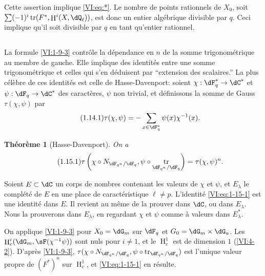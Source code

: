 \documentclass[oneside]{book}
\DeclareMathOperator{\h}{H}
\DeclareMathOperator{\tr}{tr}
\theoremstyle{sga-source}
\theoremstyle{sga-source-dash}
\theoremstyle{sga-source-dotdash}
\theoremstyle{sga-source-number-note-dash}
\theoremstyle{sga-source-note-number-dotdash}
\theoremstyle{sga-source-example-dotdash}
\theoremstyle{sga-source-inline-number}
\theoremstyle{sga-source-bare-number}
\theoremstyle{sga-source}
\newtheorem{theorem_}[subsection]{Théorème}
\newcommand{\PrintPage}[1]{}\newcommand{\MathPage}[1]{}\newcommand{\PrintCite}[2]{#1}\newcommand{\var}[3]{#1}
\begin{document}
Cette assertion implique \eqref{VI:eq:*}. Le nombre de points rationnels de 
$X_0$, soit $\var{\sum (-1)^i \tr(F^\ast,\h^i(X,\dQ_\ell))}{\sum (-1)^i \tr(F^\ast,\h_c^i(X,\dQ_\ell))}{S45-SOL-0697}$, est donc un entier 
algébrique divisible par $q$. Ceci implique qu'il soit divisible par $q$ en 
tant qu'entier rationnel. 





\PrintPage{177}
\subsection{}\label{VI:1-14}

La formule \ref{VI:1-9-3} contrôle la dépendance en $n$ de la somme 
trigonométrique au membre de gauche. Elle implique des identités entre une 
somme trigonométrique et celles qui s'en déduisent par ``extension des 
scalaires.'' La plus célèbre de ces identités est celle de 
Hasse-Davenport: soient $\chi:\dF_q^\ast \to \dC^\ast$ et 
$\psi:\dF_q\to \dC^\ast$ des caractères, $\psi$ non trivial, et 
définissons la somme de Gauss $\tau(\chi,\psi)$ par 
\begin{equation*}\tag{1.14.1}\label{VI:eq:1-14-1}
  \tau(\chi,\psi) = - \sum_{x\in \dF_q^\ast} \psi(x) \chi^{-1}(x) \text{.}
\end{equation*}





\begin{theorem_}[Hasse-Davenport]\label{VI:1-15}
On a 
\begin{equation*}\tag{1.15.1}\label{VI:eq:1-15-1}
  \tau\left(\chi\circ N_{\dF_{q^n}/\dF_q},\psi\circ \tr_{\dF_{q^n}/\dF_q}\right) = \tau(\chi,\psi)^n \text{.}
\end{equation*}
\end{theorem_}

Soient $E\subset \dC$ un corps de nombres contenant les valeurs de $\chi$ et 
$\psi$, et $E_\lambda$ le complété de $E$ en une place de caractéristique 
$\ell\ne p$. L'identité \eqref{VI:eq:1-15-1} est une identité dans $E$. Il 
revient au même de la prouver dans $\dC$, ou dans $E_\lambda$. Nous la 
prouverons dans $E_\lambda$, en regardant $\chi$ et $\psi$ comme à valeurs 
dans $E_\lambda^\ast$. 

On applique \ref{VI:1-9-3} pour $X_0=\dG_m$ sur $\dF_q$ et 
$G_0=\dG_m\times \dG_a$. Les $\h_c^i(\dG_m,\sF(\chi^{-1}\psi))$ sont nuls pour 
$i\ne 1$, et le $\h_c^1$ est de dimension $1$ (\ref{VI:4-2}). D'après 
\ref{VI:1-9-3}, 
$\tau(\chi\circ N_{\dF_{q^n}/\dF_q},\psi\circ \tr_{\dF_{q^n}/\dF_q})$ est 
l'unique valeur propre de $(F^\ast)^n$ sur $\h_c^1$, et \eqref{VI:eq:1-15-1} en 
résulte. 
\end{document}
